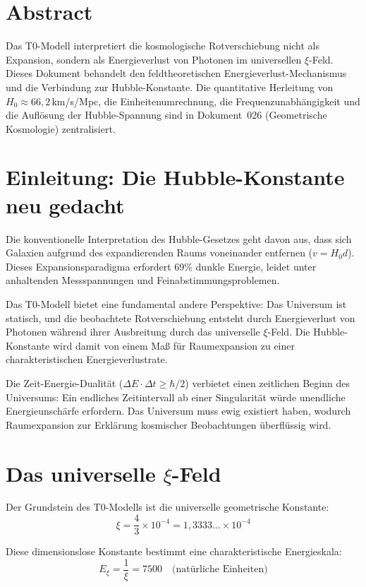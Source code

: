 \section*{Abstract}
	Das T0-Modell interpretiert die kosmologische Rotverschiebung nicht als Expansion, sondern als Energieverlust von Photonen im universellen $\xi$-Feld. Dieses Dokument behandelt den feldtheoretischen Energieverlust-Mechanismus und die Verbindung zur Hubble-Konstante. Die quantitative Herleitung von $H_0 \approx 66{,}2\,$km/s/Mpc, die Einheitenumrechnung, die Frequenzunabhängigkeit und die Auflösung der Hubble-Spannung sind in Dokument~026 (Geometrische Kosmologie) zentralisiert.


\section{Einleitung: Die Hubble-Konstante neu gedacht}

	Die konventionelle Interpretation des Hubble-Gesetzes geht davon aus, dass sich Galaxien aufgrund des expandierenden Raums voneinander entfernen ($v = H_0 d$). Dieses Expansionsparadigma erfordert 69\% dunkle Energie, leidet unter anhaltenden Messspannungen und Feinabstimmungsproblemen.

	Das T0-Modell bietet eine fundamental andere Perspektive: Das Universum ist statisch, und die beobachtete Rotverschiebung entsteht durch Energieverlust von Photonen während ihrer Ausbreitung durch das universelle $\xi$-Feld. Die Hubble-Konstante wird damit von einem Maß für Raumexpansion zu einer charakteristischen Energieverlustrate.

	Die Zeit-Energie-Dualität ($\Delta E \cdot \Delta t \geq \hbar/2$) verbietet einen zeitlichen Beginn des Universums: Ein endliches Zeitintervall ab einer Singularität würde unendliche Energieunschärfe erfordern. Das Universum muss ewig existiert haben, wodurch Raumexpansion zur Erklärung kosmischer Beobachtungen überflüssig wird.

\section{Das universelle $\xi$-Feld}

	Der Grundstein des T0-Modells ist die universelle geometrische Konstante:
	\begin{equation}
		\xi = \frac{4}{3} \times 10^{-4} = 1{,}3333\ldots \times 10^{-4}
	\end{equation}

	Diese dimensionslose Konstante bestimmt eine charakteristische Energieskala:
	\begin{equation}
		E_\xi = \frac{1}{\xi} = 7500 \quad \text{(natürliche Einheiten)}
	\end{equation}

